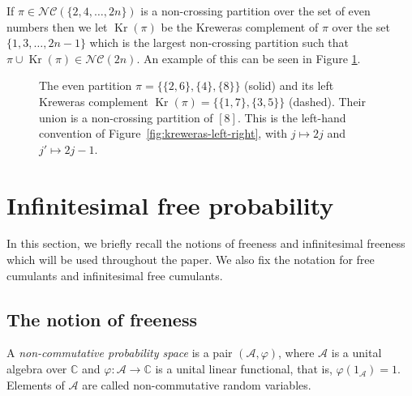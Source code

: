 \documentclass{article}
\newcommand{\paperfigurefont}{%
  \sffamily\sansmath
  \captionsetup{
    font={small,sf},
    labelfont={bf,sf}
  }%
}
\theoremstyle{definition}
\newcommand{\NC}{\mathcal{NC}}
\begin{document}
If $\pi\in \NC(\{2,4,\dots,2n\})$ is a non-crossing partition over the set of even numbers then we let $\operatorname{Kr}(\pi)$ be the Kreweras complement of $\pi$ over the set $\{1,3,\dots,2n-1\}$ which is the largest non-crossing partition such that $\pi\cup \operatorname{Kr}(\pi)\in \NC(2n)$. An example of this can be seen in Figure \ref{fig:kreweras-even-odd}.

\begin{figure}[htbp]
\centering
\paperfigurefont
{}

\caption{The even partition
$\pi=\{\{2,6\},\{4\},\{8\}\}$ (solid)
and its left Kreweras complement
$\operatorname{Kr}(\pi)=\{\{1,7\},\{3,5\}\}$ (dashed).
Their union is a non-crossing partition of $[8]$.
This is the left-hand convention of
Figure~\ref{fig:kreweras-left-right}, with
$j\mapsto 2j$ and $j'\mapsto 2j-1$.}
\label{fig:kreweras-even-odd}
\end{figure}

\section{Infinitesimal free probability}\label{Section: Inf free prob}

In this section, we briefly recall the notions of freeness and infinitesimal
freeness which will be used throughout the paper. We also fix the notation for
free cumulants and infinitesimal free cumulants.

\subsection{The notion of freeness}

A \emph{non-commutative probability space} is a pair $(\mathcal A,\varphi)$,
where $\mathcal A$ is a unital algebra over $\mathbb C$ and
$\varphi:\mathcal A\to \mathbb C$ is a unital linear functional, that is,
$\varphi(1_{\mathcal A})=1$. Elements of $\mathcal A$ are called
non-commutative random variables.
\end{document}
